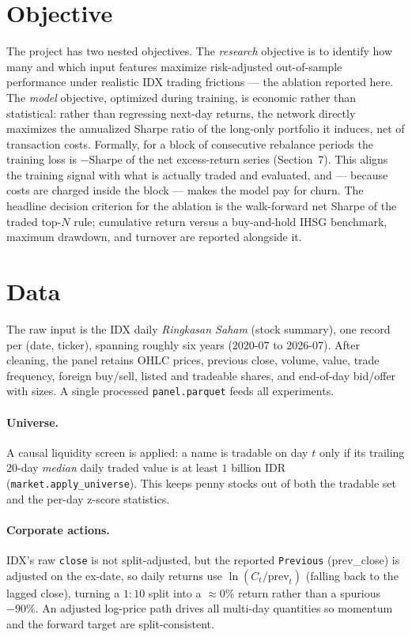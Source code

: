 \documentclass[10pt,twocolumn]{article}
\begin{document}
\section{Objective}
The project has two nested objectives. The \emph{research} objective is
to identify how many and which input features maximize risk-adjusted
out-of-sample performance under realistic IDX trading frictions --- the
ablation reported here. The \emph{model} objective, optimized during
training, is economic rather than statistical: rather than regressing
next-day returns, the network directly maximizes the annualized Sharpe
ratio of the long-only portfolio it induces, net of transaction costs.
Formally, for a block of consecutive rebalance periods the training loss
is $-\mathrm{Sharpe}$ of the net excess-return series (Section~7). This
aligns the training signal with what is actually traded and evaluated,
and --- because costs are charged inside the block --- makes the model
pay for churn. The headline decision criterion for the ablation is the
walk-forward net Sharpe of the traded top-$N$ rule; cumulative return
versus a buy-and-hold IHSG benchmark, maximum drawdown, and turnover are
reported alongside it.

\section{Data}
The raw input is the IDX daily \emph{Ringkasan Saham} (stock summary),
one record per (date, ticker), spanning roughly six years
(2020-07 to 2026-07). After cleaning, the panel retains OHLC prices,
previous close, volume, value, trade frequency, foreign buy/sell, listed
and tradeable shares, and end-of-day bid/offer with sizes. A single
processed \texttt{panel.parquet} feeds all experiments.

\paragraph{Universe.} A causal liquidity screen is applied: a name is
tradable on day $t$ only if its trailing 20-day \emph{median} daily
traded value is at least $1$ billion IDR (\texttt{market.apply\_universe}).
This keeps penny stocks out of both the tradable set and the per-day
z-score statistics.

\paragraph{Corporate actions.} IDX's raw \texttt{close} is not
split-adjusted, but the reported \texttt{Previous} (prev\_close) is
adjusted on the ex-date, so daily returns use $\ln(C_t/\text{prev}_t)$
(falling back to the lagged close), turning a $1{:}10$ split into a
$\approx 0\%$ return rather than a spurious $-90\%$. An adjusted
log-price path drives all multi-day quantities so momentum and the
forward target are split-consistent.
\end{document}
